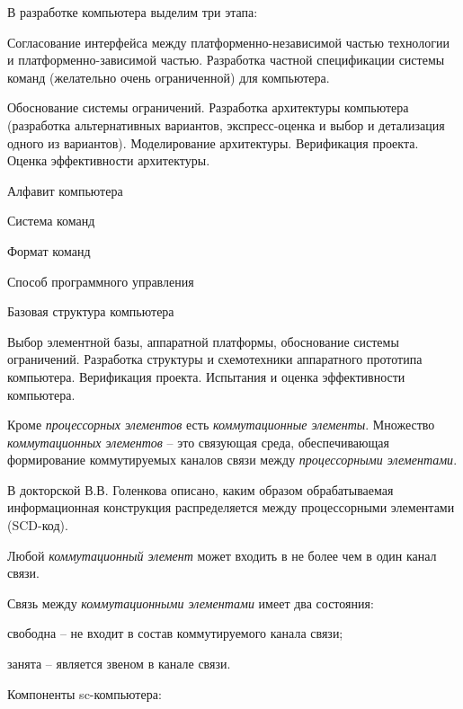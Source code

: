 В разработке компьютера выделим три этапа:
\begin{textitemize}
	\item Согласование интерфейса между платформенно-независимой частью технологии и платформенно-зависимой частью. Разработка частной спецификации системы команд (желательно очень ограниченной) для компьютера.
	\item Обоснование системы ограничений. Разработка архитектуры компьютера (разработка альтернативных вариантов, экспресс-оценка и выбор и детализация одного из вариантов). Моделирование архитектуры. Верификация проекта. Оценка эффективности архитектуры.
	\begin{textitemize}%
		\item Алфавит компьютера
		\item Система команд
		\item Формат команд
		\item Способ программного управления		
		\item Базовая структура компьютера
	\end{textitemize}
	\item Выбор элементной базы, аппаратной платформы, обоснование системы ограничений. Разработка структуры и схемотехники аппаратного прототипа компьютера. Верификация проекта. Испытания и оценка эффективности компьютера.
\end{textitemize}

Кроме \textit{процессорных элементов} есть \textit{коммутационные элементы}. Множество \textit{коммутационных элементов} -- это связующая среда, обеспечивающая формирование коммутируемых каналов связи между \textit{процессорными элементами}. 

В докторской В.В. Голенкова описано, каким образом обрабатываемая информационная конструкция распределяется между процессорными элементами (SCD-код).

Любой \textit{коммутационный элемент} может входить в не более чем в один канал связи. %

Связь между \textit{коммутационными элементами} имеет два состояния:
\begin{textitemize}
	\item свободна -- не входит в состав коммутируемого канала связи;
	\item занята -- является звеном в канале связи.
\end{textitemize}

Компоненты sc-компьютера:

